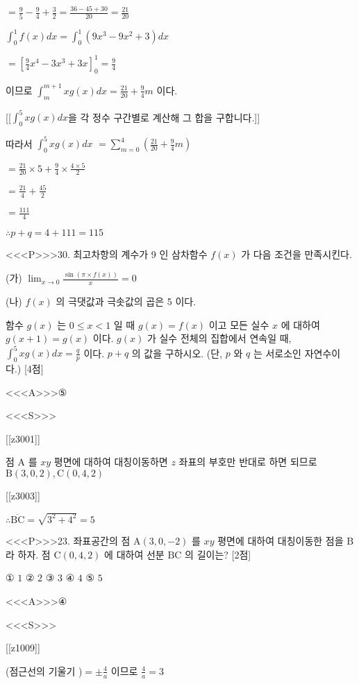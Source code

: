 \documentclass{oblivoir}
\begin{document}
$=\frac{9}{5}-\frac{9}{4}+\frac{3}{2}=\frac{36-45+30}{20}=\frac{21}{20}$

$\int_{0}^{1} f(x) d x=\int_{0}^{1}\left(9 x^{3}-9 x^{2}+3\right) d x$

$=\left[\frac{9}{4} x^{4}-3 x^{3}+3 x\right]_{0}^{1}=\frac{9}{4}$

이므로 $\int_{m}^{m+1} x g(x) d x=\frac{21}{20}+\frac{9}{4} m$ 이다.

[[$\int_{0}^{5} x g(x) d x$을 각 정수 구간별로 계산해 그 합을 구합니다.]]

따라서 $\int_{0}^{5} x g(x) d x $
$=\sum_{m=0}^{4}\left(\frac{21}{20}+\frac{9}{4} m\right)$

$=\frac{21}{20} \times 5+\frac{9}{4} \times \frac{4 \times 5}{2}$

$=\frac{21}{4}+\frac{45}{2}$

$=\frac{111}{4}$

$\therefore p+q=4+111=115$


<<<P>>>30. 최고차항의 계수가 9 인 삼차함수 $f(x)$ 가 다음 조건을 만족시킨다.

(가) $\lim _{x \rightarrow 0} \frac{\sin (\pi \times f(x))}{x}=0$

(나) $f(x)$ 의 극댓값과 극솟값의 곱은 5 이다.

함수 $g(x)$ 는 $0 \leq x<1$ 일 때 $g(x)=f(x)$ 이고 모든 실수 $x$ 에 대하여 $g(x+1)=g(x)$ 이다.
$g(x)$ 가 실수 전체의 집합에서 연속일 때, $\int_{0}^{5} x g(x) d x=\frac{q}{p}$ 이다. $p+q$ 의 값을 구하시오. (단, $p$ 와 $q$ 는 서로소인 자연수이다.) [4점]



<<<A>>>⑤

<<<S>>>

[[z3001]]

점 $\mathrm{A}$ 를 $x y$ 평면에 대하여 대칭이동하면 $z$ 좌표의 부호만 반대로 하면 되므로 
$\mathrm{B}(3,0,2), \mathrm{C}(0,4,2)$

[[z3003]]

$\therefore \overline{\mathrm{BC}}=\sqrt{3^{2}+4^{2}}=5$


<<<P>>>23. 좌표공간의 점 $\mathrm{A}(3,0,-2)$ 를 $x y$ 평면에 대하여 대칭이동한 점을 $\mathrm{B}$ 라 하자. 점 $\mathrm{C}(0,4,2)$ 에 대하여 선분 $\mathrm{BC}$ 의 길이는? [2점]

① $1$
② $2$
③ $3$
④ $4$
⑤ $5$


<<<A>>>④

<<<S>>>

[[z1009]]

(점근선의 기울기 )$=\pm \frac{4}{a}$ 이므로 $\frac{4}{a}=3$
\end{document}
